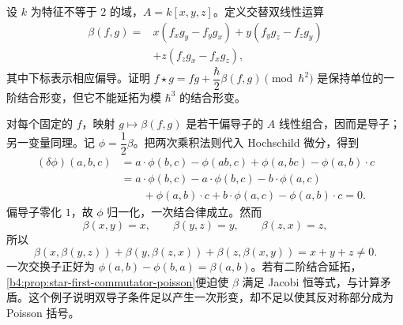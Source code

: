 \begin{optionalexercise}\label{b4:ex:nonpoisson-first-deformation}
	设 \(k\) 为特征不等于 \(2\) 的域，\(A=k[x,y,z]\)。定义交替双线性运算
	\[
		\begin{aligned}
			\beta(f,g)={}&x(f_xg_y-f_yg_x)+y(f_yg_z-f_zg_y)\\
			&+z(f_zg_x-f_xg_z),
		\end{aligned}
	\]
	其中下标表示相应偏导。证明 \(f\star g=fg+\dfrac{\hbar}{2}\beta(f,g)\pmod{\hbar^2}\) 是保持单位的一阶结合形变，但它不能延拓为模 \(\hbar^3\) 的结合形变。
\end{optionalexercise}
\begin{solution}
	对每个固定的 \(f\)，映射 \(g\mapsto\beta(f,g)\) 是若干偏导子的 \(A\) 线性组合，因而是导子；另一变量同理。记 \(\phi=\dfrac12\beta\)。把两次乘积法则代入 Hochschild 微分，得到
	\[
		\begin{aligned}
			(\delta\phi)(a,b,c)
			&=a\cdot\phi(b,c)-\phi(ab,c)+\phi(a,bc)-\phi(a,b)\cdot c\\
			&=a\cdot\phi(b,c)-a\cdot\phi(b,c)-b\cdot\phi(a,c)\\
			&\qquad+\phi(a,b)\cdot c+b\cdot\phi(a,c)-\phi(a,b)\cdot c=0.
		\end{aligned}
	\]
	偏导子零化 \(1\)，故 \(\phi\) 归一化，一次结合律成立。然而
	\[
		\beta(x,y)=x,\qquad \beta(y,z)=y,\qquad \beta(z,x)=z,
	\]
	所以
	\[
		\beta(x,\beta(y,z))+\beta(y,\beta(z,x))+\beta(z,\beta(x,y))
		=x+y+z\ne0.
	\]
	一次交换子正好为 \(\phi(a,b)-\phi(b,a)=\beta(a,b)\)。若有二阶结合延拓，\cref{b4:prop:star-first-commutator-poisson}便迫使 \(\beta\) 满足 Jacobi 恒等式，与计算矛盾。这个例子说明双导子条件足以产生一次形变，却不足以使其反对称部分成为 Poisson 括号。
\end{solution}

